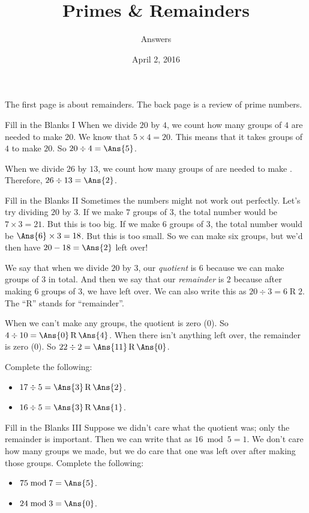 \documentclass[12pt,letterpaper]{article}
\title{Primes \& Remainders}
\author{Answers}
\date{April 2, 2016}
\begin{document}
\maketitle

\thispagestyle{empty}

The first page is about remainders. The back page is a review of prime numbers.

\begin{problem}{Fill in the Blanks I}
 When we divide $20$ by $4$, we count how many groups of $4$ are needed to make
 $20$. We know that $5 \times 4 = 20$. This means that it takes  groups
 of $4$ to make $20$. So $20 \div 4 = \Ans{5}$.

 When we divide $26$ by $13$, we count how many groups of  are needed to
 make . Therefore, $26 \div 13 = \Ans{2}$.
\end{problem}

\begin{problem}{Fill in the Blanks II}
 Sometimes the numbers might not work out perfectly. Let's try dividing $20$ by
 $3$. If we make $7$ groups of $3$, the total number would be $7 \times 3 = 21$.
 But this is too big. If we make $6$ groups of $3$, the total number would be
 $\Ans{6} \times 3 = 18$. But this is too small. So we can make six groups, but
 we'd then have $20 - 18 = \Ans{2}$ left over!

 We say that when we divide $20$ by $3$, our \emph{quotient} is $6$ because we
 can make  groups of $3$ in total. And then we say that our
 \emph{remainder} is $2$ because after making $6$ groups of $3$, we have
  left over. We can also write this as $20 \div 3 = 6 \operatorname{R}
 2$. The ``R'' stands for ``remainder''.

 When we can't make any groups, the quotient is zero ($0$). So $4 \div 10 =
 \Ans{0} \operatorname{R} \Ans{4}$. When there isn't anything left over, the
 remainder is zero ($0$). So $22 \div 2 = \Ans{11} \operatorname{R} \Ans{0}$.

 Complete the following: \begin{itemize}
  \item $17 \div 5 = \Ans{3} \operatorname{R} \Ans{2}$.
  \item $16 \div 5 = \Ans{3} \operatorname{R} \Ans{1}$.
 \end{itemize}
\end{problem}

\begin{problem}{Fill in the Blanks III}
 Suppose we didn't care what the quotient was; only the remainder is important.
 Then we can write that as $16 \bmod 5 = 1$. We don't care how many groups we
 made, but we do care that one was left over after making those groups. Complete
 the following:

 \begin{itemize}
  \item $75 \bmod 7 = \Ans{5}$.
  \item $24 \bmod 3 = \Ans{0}$.
 \end{itemize}
\end{problem}
\end{document}
